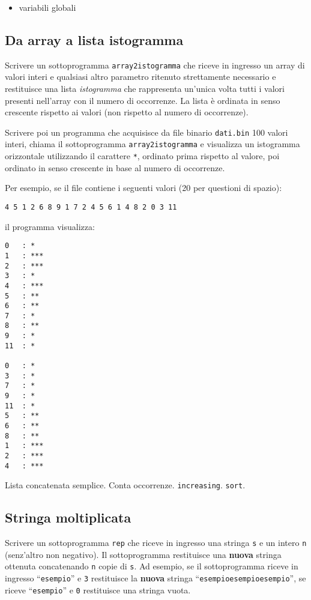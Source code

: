\begin{itemize}
\item variabili globali
\end{itemize}

\mysep{}

\subsection{Da array a lista istogramma}
Scrivere un sottoprogramma \texttt{array2istogramma} che riceve in ingresso un array di valori interi e qualsiasi altro parametro ritenuto strettamente necessario e restituisce una lista \textit{istogramma} che rappresenta un'unica volta tutti i valori presenti nell'array con il numero di occorrenze. La lista \`e ordinata in senso crescente rispetto ai valori (non rispetto al numero di occorrenze).

Scrivere poi un programma che acquisisce da file binario \texttt{dati.bin} 100 valori interi, chiama il sottoprogramma \texttt{array2istogramma} e visualizza un istogramma orizzontale utilizzando il carattere \texttt{*}, ordinato prima rispetto al valore, poi ordinato in senso crescente in base al numero di occorrenze.

Per esempio, se il file contiene i seguenti valori (20 per questioni di spazio):

\begin{verbatim}
4 5 1 2 6 8 9 1 7 2 4 5 6 1 4 8 2 0 3 11
\end{verbatim}

il programma visualizza:

\begin{verbatim}
0	: *
1	: ***
2	: ***
3	: *
4	: ***
5	: **
6	: **
7	: *
8	: **
9	: *
11	: *

0	: *
3	: *
7	: *
9	: *
11	: *
5	: **
6	: **
8	: **
1	: ***
2	: ***
4	: ***
\end{verbatim}

\begin{tags}
Lista concatenata semplice. Conta occorrenze.
\texttt{increasing}.
\texttt{sort}.
\end{tags}


\subsection{Stringa moltiplicata}
Scrivere un sottoprogramma \texttt{rep} che riceve in ingresso una stringa \texttt{s} e un intero \texttt{n} (senz'altro non negativo). Il sottoprogramma restituisce una \textbf{nuova} stringa ottenuta concatenando \texttt{n} copie di \texttt{s}. Ad esempio, se il sottoprogramma riceve in ingresso ``\texttt{esempio}'' e \texttt{3} restituisce la \textbf{nuova} stringa ``\texttt{esempioesempioesempio}'', se riceve ``\texttt{esempio}'' e \texttt{0} restituisce una stringa vuota.

